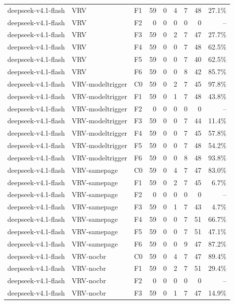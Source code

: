 \begin{tabular}{lllrrrrrr}
deepseek-v4.1-flash & VRV & F1 & 59 & 0 & 4 & 7 & 48 & 27.1\% \\
deepseek-v4.1-flash & VRV & F2 & 0 & 0 & 0 & 0 & 0 & -- \\
deepseek-v4.1-flash & VRV & F3 & 59 & 0 & 2 & 7 & 47 & 27.7\% \\
deepseek-v4.1-flash & VRV & F4 & 59 & 0 & 0 & 7 & 48 & 62.5\% \\
deepseek-v4.1-flash & VRV & F5 & 59 & 0 & 0 & 7 & 40 & 62.5\% \\
deepseek-v4.1-flash & VRV & F6 & 59 & 0 & 0 & 8 & 42 & 85.7\% \\
deepseek-v4.1-flash & VRV-modeltrigger & C0 & 59 & 0 & 2 & 7 & 45 & 97.8\% \\
deepseek-v4.1-flash & VRV-modeltrigger & F1 & 59 & 0 & 1 & 7 & 48 & 43.8\% \\
deepseek-v4.1-flash & VRV-modeltrigger & F2 & 0 & 0 & 0 & 0 & 0 & -- \\
deepseek-v4.1-flash & VRV-modeltrigger & F3 & 59 & 0 & 0 & 7 & 44 & 11.4\% \\
deepseek-v4.1-flash & VRV-modeltrigger & F4 & 59 & 0 & 0 & 7 & 45 & 57.8\% \\
deepseek-v4.1-flash & VRV-modeltrigger & F5 & 59 & 0 & 0 & 7 & 48 & 54.2\% \\
deepseek-v4.1-flash & VRV-modeltrigger & F6 & 59 & 0 & 0 & 8 & 48 & 93.8\% \\
deepseek-v4.1-flash & VRV-samepage & C0 & 59 & 0 & 4 & 7 & 47 & 83.0\% \\
deepseek-v4.1-flash & VRV-samepage & F1 & 59 & 0 & 2 & 7 & 45 & 6.7\% \\
deepseek-v4.1-flash & VRV-samepage & F2 & 0 & 0 & 0 & 0 & 0 & -- \\
deepseek-v4.1-flash & VRV-samepage & F3 & 59 & 0 & 1 & 7 & 43 & 4.7\% \\
deepseek-v4.1-flash & VRV-samepage & F4 & 59 & 0 & 0 & 7 & 51 & 66.7\% \\
deepseek-v4.1-flash & VRV-samepage & F5 & 59 & 0 & 0 & 7 & 51 & 47.1\% \\
deepseek-v4.1-flash & VRV-samepage & F6 & 59 & 0 & 0 & 9 & 47 & 87.2\% \\
deepseek-v4.1-flash & VRV-nocbr & C0 & 59 & 0 & 4 & 7 & 47 & 89.4\% \\
deepseek-v4.1-flash & VRV-nocbr & F1 & 59 & 0 & 2 & 7 & 51 & 29.4\% \\
deepseek-v4.1-flash & VRV-nocbr & F2 & 0 & 0 & 0 & 0 & 0 & -- \\
deepseek-v4.1-flash & VRV-nocbr & F3 & 59 & 0 & 1 & 7 & 47 & 14.9\% \\

\end{tabular}
